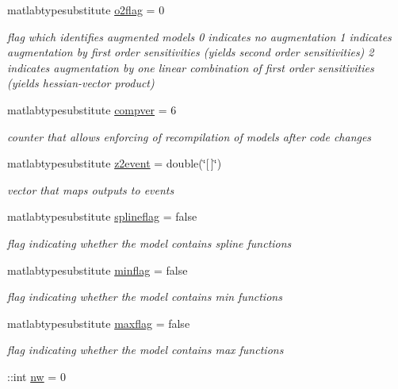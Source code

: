 \begin{DoxyCompactItemize}
matlabtypesubstitute \hyperlink{classamimodel_a2b89e3b4e249878a2d436ee337952c4f}{o2flag} = 0
\begin{DoxyCompactList}\small\item\em flag which identifies augmented models 0 indicates no augmentation 1 indicates augmentation by first order sensitivities (yields second order sensitivities) 2 indicates augmentation by one linear combination of first order sensitivities (yields hessian-\/vector product) \end{DoxyCompactList}\item 
matlabtypesubstitute \hyperlink{classamimodel_a0a9e4caf628a02e6db68e91c2de6f382}{compver} = 6
\begin{DoxyCompactList}\small\item\em counter that allows enforcing of recompilation of models after code changes \end{DoxyCompactList}\item 
matlabtypesubstitute \hyperlink{classamimodel_a7a7be015feeb7a346dceccd49e622b4b}{z2event} = double(\char`\"{}\mbox{[}$\,$\mbox{]}\char`\"{})
\begin{DoxyCompactList}\small\item\em vector that maps outputs to events \end{DoxyCompactList}\item 
matlabtypesubstitute \hyperlink{classamimodel_abea45d67286ebbf35dcbc12e335ffd51}{splineflag} = false
\begin{DoxyCompactList}\small\item\em flag indicating whether the model contains spline functions \end{DoxyCompactList}\item 
matlabtypesubstitute \hyperlink{classamimodel_affead4b7a87bc135fea91fd5aada78a8}{minflag} = false
\begin{DoxyCompactList}\small\item\em flag indicating whether the model contains min functions \end{DoxyCompactList}\item 
matlabtypesubstitute \hyperlink{classamimodel_a1a65e7157ae2262cfa11a783b018364f}{maxflag} = false
\begin{DoxyCompactList}\small\item\em flag indicating whether the model contains max functions \end{DoxyCompactList}\item 
\+::int \hyperlink{classamimodel_a371815f74d602ff1338376abbd1278e4}{nw} = 0

\end{DoxyCompactItemize}
